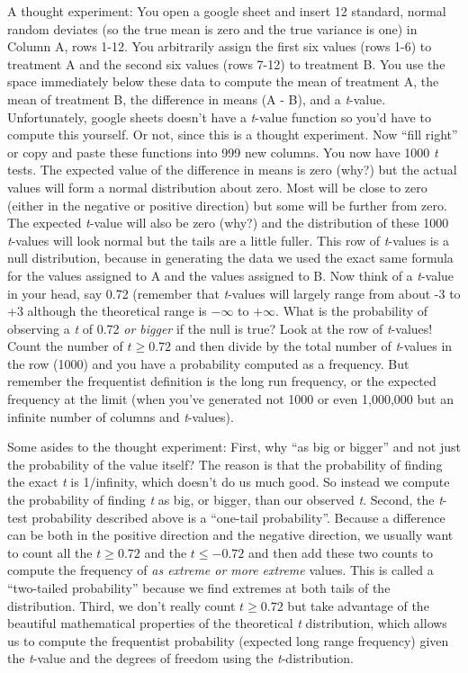 \documentclass[]{book}
\begin{document}
A thought experiment: You open a google sheet and insert 12 standard, normal random deviates (so the true mean is zero and the true variance is one) in Column A, rows 1-12. You arbitrarily assign the first six values (rows 1-6) to treatment A and the second six values (rows 7-12) to treatment B. You use the space immediately below these data to compute the mean of treatment A, the mean of treatment B, the difference in means (A - B), and a \emph{t}-value. Unfortunately, google sheets doesn't have a \emph{t}-value function so you'd have to compute this yourself. Or not, since this is a thought experiment. Now ``fill right'' or copy and paste these functions into 999 new columns. You now have 1000 \emph{t} tests. The expected value of the difference in means is zero (why?) but the actual values will form a normal distribution about zero. Most will be close to zero (either in the negative or positive direction) but some will be further from zero. The expected \emph{t}-value will also be zero (why?) and the distribution of these 1000 \emph{t}-values will look normal but the tails are a little fuller. This row of \emph{t}-values is a null distribution, because in generating the data we used the exact same formula for the values assigned to A and the values assigned to B. Now think of a \emph{t}-value in your head, say 0.72 (remember that \emph{t}-values will largely range from about -3 to +3 although the theoretical range is \(-\infty\) to \(+\infty\). What is the probability of observing a \emph{t} of 0.72 \emph{or bigger} if the null is true? Look at the row of \emph{t}-values! Count the number of \(t \ge 0.72\) and then divide by the total number of \emph{t}-values in the row (1000) and you have a probability computed as a frequency. But remember the frequentist definition is the long run frequency, or the expected frequency at the limit (when you've generated not 1000 or even 1,000,000 but an infinite number of columns and \emph{t}-values).

Some asides to the thought experiment: First, why ``as big or bigger'' and not just the probability of the value itself? The reason is that the probability of finding the exact \emph{t} is 1/infinity, which doesn't do us much good. So instead we compute the probability of finding \emph{t} as big, or bigger, than our observed \emph{t}. Second, the \emph{t}-test probability described above is a ``one-tail probability''. Because a difference can be both in the positive direction and the negative direction, we usually want to count all the \(t \ge 0.72\) and the \(t \le -0.72\) and then add these two counts to compute the frequency of \emph{as extreme or more extreme} values. This is called a ``two-tailed probability'' because we find extremes at both tails of the distribution. Third, we don't really count \(t \ge 0.72\) but take advantage of the beautiful mathematical properties of the theoretical \emph{t} distribution, which allows us to compute the frequentist probability (expected long range frequency) given the \emph{t}-value and the degrees of freedom using the \emph{t}-distribution.
\end{document}
